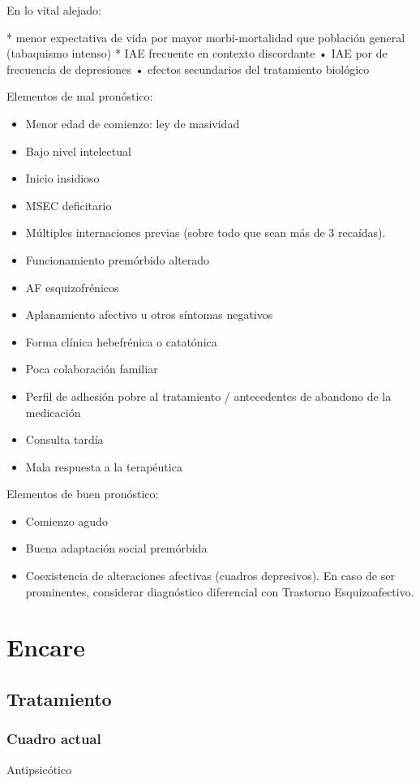 En lo vital alejado:

* menor expectativa de vida por mayor morbi-mortalidad que población general (tabaquismo intenso)
* IAE frecuente en contexto discordante • IAE por de frecuencia de depresiones • efectos secundarios del tratamiento biológico

Elementos de mal pronóstico:
\begin{itemize}
    \item Menor edad de comienzo: ley de masividad
    \item Bajo nivel intelectual
    \item Inicio insidioso
    \item MSEC deficitario
    \item Múltiples internaciones previas (sobre todo que sean más de 3 recaídas).
    \item Funcionamiento premórbido alterado
    \item AF esquizofrénicos
    \item Aplanamiento afectivo u otros síntomas negativos
    \item Forma clínica hebefrénica o catatónica
    \item Poca colaboración familiar
    \item Perfil de adhesión pobre al tratamiento / antecedentes de abandono de la medicación
    \item Consulta tardía
    \item Mala respuesta a la terapéutica
\end{itemize}
Elementos de buen pronóstico:
\begin{itemize}
    \item Comienzo agudo
    \item Buena adaptación social premórbida
    \item Coexistencia de alteraciones afectivas (cuadros depresivos). En caso de ser prominentes, considerar diagnóstico diferencial con Trastorno Esquizoafectivo.
\end{itemize}
\section*{Encare}
\subsection*{Tratamiento}
\subsubsection*{Cuadro actual}
Antipsicótico

